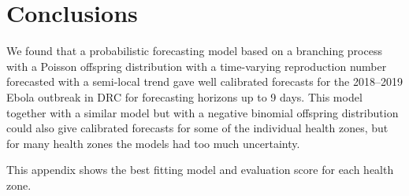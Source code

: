 \documentclass[12pt]{article}
\begin{document}









\section{Conclusions}
We found that a probabilistic forecasting model based on a branching process with a Poisson offspring distribution with a time-varying reproduction number forecasted with a semi-local trend gave well calibrated forecasts for the 2018--2019 Ebola outbreak in DRC for forecasting horizons up to 9 days. This model together with a similar model but with a negative binomial offspring distribution could also give calibrated forecasts for some of the individual health zones, but for many health zones the models had too much uncertainty. 


\newpage

 


\clearpage
\newpage

\appendix
\appendixpage
\addappheadtotoc
{}
This appendix shows the best fitting model and evaluation score for each health zone.


\end{document}
